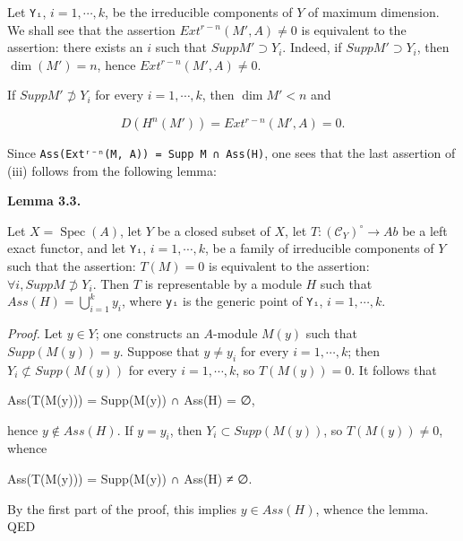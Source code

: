 \documentclass[
  11pt,
  a4paper,
]{book}
\newenvironment{Shaded}{}{}
\newcommand{\NormalTok}[1]{#1}
\begin{document}
Let \texttt{Yᵢ}, \(i = 1, \cdots, k\), be the irreducible components of
\(Y\) of maximum dimension. We shall see that the assertion
\(Ext^{r-n}(M', A) \neq 0\) is equivalent to the assertion: there exists
an \(i\) such that \(Supp M' \supset Y_{i}\). Indeed, if
\(Supp M' \supset Y_{i}\), then \(\dim(M') = n\), hence
\(Ext^{r-n}(M', A) \neq 0\).

If \(Supp M' \not\supset Y_{i}\) for every \(i = 1, \cdots, k\), then
\(\dim M' < n\) and

\[ D(H^{n}(M')) = Ext^{r-n}(M', A) = 0. \]

Since \texttt{Ass(Extʳ⁻ⁿ(M,\ A))\ =\ Supp\ M\ ∩\ Ass(H)}, one sees that
the last assertion of (iii) follows from the following lemma:

\textbf{Lemma 3.3.}

Let \(X = \operatorname{Spec}(A)\), let \(Y\) be a closed subset of
\(X\), let \(T: (\mathcal{C}_{Y})^{\circ} \to Ab\) be a left exact
functor, and let \texttt{Yᵢ}, \(i = 1, \cdots, k\), be a family of
irreducible components of \(Y\) such that the assertion: \(T(M) = 0\) is
equivalent to the assertion: \(\forall i, Supp M \not\supset Y_{i}\).
Then \(T\) is representable by a module \(H\) such that
\(Ass(H) = \bigcup^{k}_{i=1} {y_{i}}\), where \texttt{yᵢ} is the generic
point of \texttt{Yᵢ}, \(i = 1, \cdots, k\).

\emph{Proof.} Let \(y \in Y\); one constructs an \(A\)-module \(M(y)\)
such that \(Supp(M(y)) = {y}\). Suppose that \(y \neq y_{i}\) for every
\(i = 1, \cdots, k\); then \(Y_{i} \not\subset Supp(M(y))\) for every
\(i = 1, \cdots, k\), so \(T(M(y)) = 0\). It follows that

\begin{Shaded}
\begin{Highlighting}[]
\NormalTok{Ass(T(M(y))) = Supp(M(y)) ∩ Ass(H) = ∅,}
\end{Highlighting}
\end{Shaded}

hence \(y \notin Ass(H)\). If \(y = y_{i}\), then
\(Y_{i} \subset Supp(M(y))\), so \(T(M(y)) \neq 0\), whence

\begin{Shaded}
\begin{Highlighting}[]
\NormalTok{Ass(T(M(y))) = Supp(M(y)) ∩ Ass(H) ≠ ∅.}
\end{Highlighting}
\end{Shaded}

By the first part of the proof, this implies \(y \in Ass(H)\), whence
the lemma. QED
\end{document}
